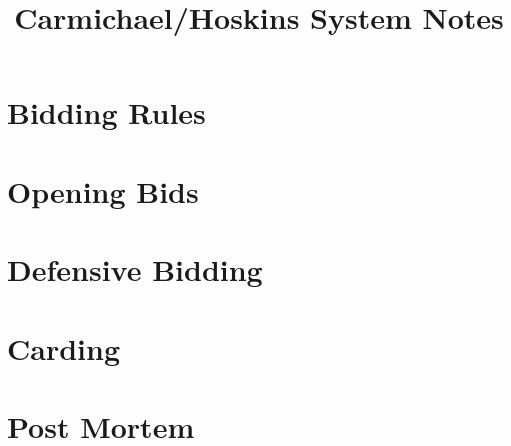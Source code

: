 \documentclass[letter,10pt,oneside]{memoir}
\begin{document}
\frontmatter
\title{Carmichael/Hoskins System Notes}
\maketitle
\tableofcontents

\mainmatter
\part{Bidding Rules}


\part{Opening Bids}
%
%
%
%
%
%
%
%
%
%
%

\part{Defensive Bidding}
\part{Carding}
\part{Post Mortem}
%
\backmatter
\end{document}
